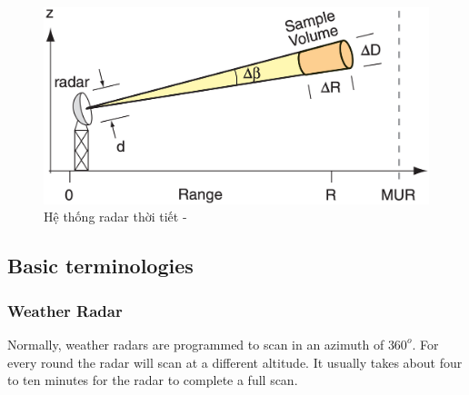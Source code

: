 
\vspace{2cm}
\begin{figure}[H]
    \centering
    \includegraphics[width=1\linewidth]{Images/radar_concept.png}
    \vspace{1em}
    \caption{Hệ thống radar thời tiết - \cite{2022Weather}}
    \label{fig:radar}
\end{figure}
\newpage
\subsection{Basic terminologies}


\subsubsection{Weather Radar}

Normally, weather radars are programmed to scan in an azimuth of $360^o$.
For every round the radar will scan at a different altitude.
It usually takes about four to ten minutes for the radar to complete a full scan.

